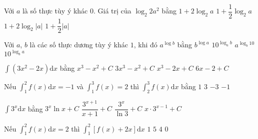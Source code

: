 \begin{ex}%
	Với $a$ là số thực tùy ý khác $0$. Giá trị của $\log_2 2a^2$ bằng
	\choice
	{$1+2\log_2 a$}
	{$1+\dfrac{1}{2}\log_2 a$}
	{\True $1+2\log_2 \left| a \right |$}
	{$1+\dfrac{1}{2}\left| a \right |$}
\end{ex}

\begin{ex}%
	Với $a$, $b$ là các số thực dương tùy ý khác $1$, khi đó $a^{\log b}$ bằng
	\choice
	{\True $b^{\log a}$}
	{$10^{\log_a b}$}
	{$a^{\log_b 10}$}
	{$10^{\log_b a}$}
\end{ex}

\begin{ex}%
	$\displaystyle \int (3x^2-2x) \mathrm{d}x$ bằng
	\choice
	{\True $x^3-x^2+C$}
	{$3x^3-x^2+C$}
	{$x^3-2x+C$}
	{$6x-2+C$}
\end{ex}

\begin{ex}%
	Nếu $\displaystyle \int_{1}^{2}f(x)\mathrm{d}x=-1$ và $\displaystyle \int_{1}^{3}f(x)=2$ thì $\displaystyle\int_{2}^{3} f(x)\mathrm{d}x$ bằng
	\choice
	{$1$}
	{\True $3$}
	{$-3$}
	{$-1$}
\end{ex}

\begin{ex}%
	$\displaystyle \int 3^x \mathrm{d}x$ bằng
	\choice
	{$3^x\ln {x}+C$}
	{$\dfrac{3^{x+1}}{x+1}+C$}
	{\True $\dfrac{3^x}{\ln {3}}+C$}
	{$x\cdot 3^{x-1}+C$}
\end{ex}

\begin{ex}%
	Nếu $\displaystyle \int_{1}^{2}f(x)\mathrm{d}x=2$ thì $\displaystyle\int_{1}^{2}[f(x)+2x]\mathrm{d}x$
	\choice
	{$1$}
	{\True $5$}
	{$4$}
	{$0$}
\end{ex}

